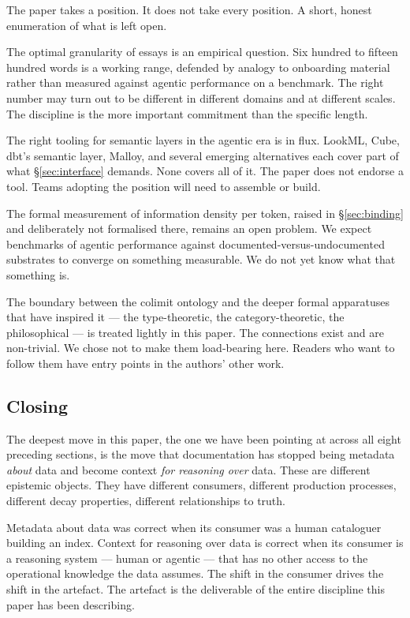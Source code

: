 \documentclass[11pt,a4paper]{article}
\begin{document}
The paper takes a position. It does not take every position. A short, honest enumeration of what is left open.

The optimal granularity of essays is an empirical question. Six hundred to fifteen hundred words is a working range, defended by analogy to onboarding material rather than measured against agentic performance on a benchmark. The right number may turn out to be different in different domains and at different scales. The discipline is the more important commitment than the specific length.

The right tooling for semantic layers in the agentic era is in flux. LookML, Cube, dbt's semantic layer, Malloy, and several emerging alternatives each cover part of what \S\ref{sec:interface} demands. None covers all of it. The paper does not endorse a tool. Teams adopting the position will need to assemble or build.

The formal measurement of information density per token, raised in \S\ref{sec:binding} and deliberately not formalised there, remains an open problem. We expect benchmarks of agentic performance against documented-versus-undocumented substrates to converge on something measurable. We do not yet know what that something is.

The boundary between the colimit ontology and the deeper formal apparatuses that have inspired it --- the type-theoretic, the category-theoretic, the philosophical --- is treated lightly in this paper. The connections exist and are non-trivial. We chose not to make them load-bearing here. Readers who want to follow them have entry points in the authors' other work.

\subsection{Closing}

The deepest move in this paper, the one we have been pointing at across all eight preceding sections, is the move that documentation has stopped being metadata \emph{about} data and become context \emph{for reasoning over} data. These are different epistemic objects. They have different consumers, different production processes, different decay properties, different relationships to truth.

Metadata about data was correct when its consumer was a human cataloguer building an index. Context for reasoning over data is correct when its consumer is a reasoning system --- human or agentic --- that has no other access to the operational knowledge the data assumes. The shift in the consumer drives the shift in the artefact. The artefact is the deliverable of the entire discipline this paper has been describing.
\end{document}
